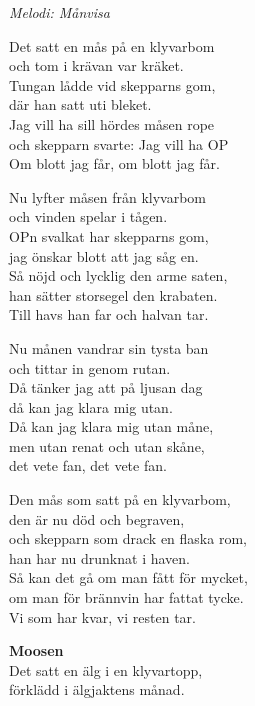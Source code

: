 {\footnotesize\textit{Melodi: Månvisa}}\par
\vspace{10pt}
Det satt en mås på en klyvarbom\\
och tom i krävan var kräket.\\
Tungan lådde vid skepparns gom,\\
där han satt uti bleket.\\
Jag vill ha sill hördes måsen rope\\
och skepparn svarte: Jag vill ha OP\\
Om blott jag får, om blott jag får.\par
\vspace{10pt}
Nu lyfter måsen från klyvarbom\\
och vinden spelar i tågen.\\
OPn svalkat har skepparns gom,\\
jag önskar blott att jag såg en.\\
Så nöjd och lycklig den arme saten,\\
han sätter storsegel den krabaten.\\
Till havs han far och halvan tar.\par
\vspace{10pt}
Nu månen vandrar sin tysta ban\\
och tittar in genom rutan.\\
Då tänker jag att på ljusan dag\\
då kan jag klara mig utan.\\
Då kan jag klara mig utan måne,\\ 
men utan renat och utan skåne,\\
det vete fan, det vete fan.\par
\newpage
Den mås som satt på en klyvarbom,\\
den är nu död och begraven,\\
och skepparn som drack en flaska rom,\\
han har nu drunknat i haven.\\
Så kan det gå om man fått för mycket,\\
om man för brännvin har fattat tycke.\\
Vi som har kvar, vi resten tar.\par
\vspace{15pt}
\textbf{Moosen}\\
Det satt en älg i en klyvartopp,\\
förklädd i älgjaktens månad.\\
